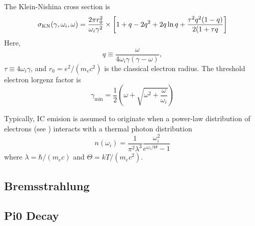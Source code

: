 The Klein-Nishina cross section is
\begin{equation}
\sigma_\text{KN}(\gamma,\omega_i,\omega) = \frac{2\pi r_0^2}{\omega_i \gamma^2}
  \times 
  \left[
  1 + q - 2q^2 + 2q\ln q + \frac{\tau^2 q^2 (1-q)}{2(1+\tau q}
  \right]
\end{equation}
Here,
\begin{equation}
  q \equiv \frac{\omega}{4 \omega_i \gamma (\gamma-\omega)},
\end{equation}
$\tau \equiv 4\omega_i \gamma$, and $r_0 = e^2/(m_e c^2)$ is the classical
electron radius.
The threshold electron lorgenz factor is
\begin{equation}
  \gamma_\text{min} =
  \frac{1}{2} 
  \left(
  \omega + \sqrt{\omega^2 + \frac{\omega}{\omega_i}}
  \right)
\end{equation}

Typically, \ac{IC} emision is assumed to originate when
a power-law distribution of electrons
(see )
interacts with
a thermal photon distribution
\begin{equation}
  n(\omega_i) = 
  \frac{1}{\pi^2\lambda^3} 
  \frac{\omega_i^2}{e^{\omega_i/\Theta} -1}
\end{equation}
where $\lambda=\hbar/(m_e c)$ and $\Theta=kT/(m_e c^2)$.


\subsection{Bremsstrahlung}


\subsection{Pi0 Decay}


